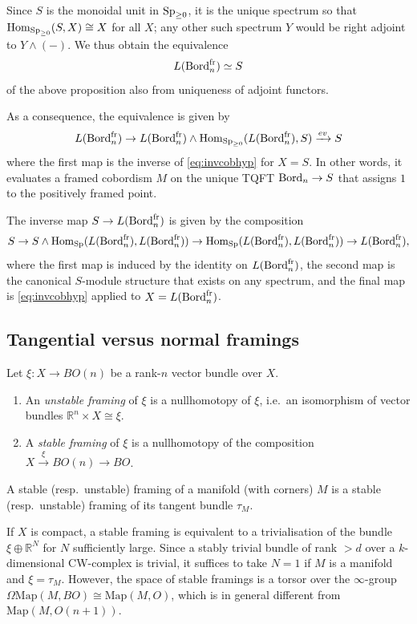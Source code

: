 \documentclass{amsart}
\begin{document}
\begin{remark}
Since $S$ is the monoidal unit in $\operatorname{Sp}_{\ge 0}$, it is the unique spectrum so that $\operatorname{Hom}_{\operatorname{Sp}_{\ge 0}}(S, X) \cong X$ for all $X$; any other such spectrum $Y$ would be right adjoint to $Y \wedge (-)$. 
We thus obtain the equivalence\[L(\operatorname{Bord}_n^{\mathrm{fr}})\simeq S\] of the above proposition also from uniqueness of adjoint functors.

As a consequence, the equivalence is given by 
\[
L(\operatorname{Bord}_n^{\mathrm{fr}}) \to L(\operatorname{Bord}_n^{\mathrm{fr}}) \wedge \operatorname{Hom}_{\operatorname{Sp}_{\geq 0}}(L(\operatorname{Bord}_n^{\mathrm{fr}}), S) \xrightarrow{ev} S
\]
where the first map is the inverse of \eqref{eq:invcobhyp} for $X = S$.
In other words, it evaluates a framed cobordism $M$ on the unique TQFT $\operatorname{Bord}_n \to S$ that assigns $1$ to the positively framed point.

The inverse map $S \to L(\operatorname{Bord}_n^{\mathrm{fr}})$ is given by the composition
\[
S \to S \wedge \operatorname{Hom}_{\operatorname{Sp}}(L(\operatorname{Bord}_n^{\mathrm{fr}}),L(\operatorname{Bord}_n^{\mathrm{fr}})) \to \operatorname{Hom}_{\operatorname{Sp}}(L(\operatorname{Bord}_n^{\mathrm{fr}}),L(\operatorname{Bord}_n^{\mathrm{fr}})) \to L(\operatorname{Bord}_n^{\mathrm{fr}}),
\]
where the first map is induced by the identity on $L(\operatorname{Bord}_n^{\mathrm{fr}})$, the second map is the canonical $S$-module structure that exists on any spectrum, and the final map is \eqref{eq:invcobhyp} applied to $X = L(\operatorname{Bord}_n^{\mathrm{fr}})$.
\end{remark}
 

\subsection{Tangential versus normal framings}
\label{sec:tangential-normal}

\begin{definition}
\label{def:framing}
Let $\xi \colon X \to BO(n)$ be a rank-$n$ vector bundle over $X$.
\begin{enumerate}
\item[$\natural_1$] An \emph{unstable framing} of $\xi$ is a nullhomotopy of $\xi$, i.e.\ an isomorphism of vector bundles $\mathbb{R}^n \times X \cong \xi$.
\item[$\natural_2$] A \emph{stable framing} of $\xi$ is a nullhomotopy of the composition $X \xrightarrow{\xi} BO(n) \to BO$.
\end{enumerate}
A stable (resp.\ unstable) framing of a manifold (with corners) $M$ is a stable (resp.\ unstable) framing of its tangent bundle $\tau_M$.
\end{definition}

If $X$ is compact, a stable framing is equivalent to a trivialisation of the bundle $\xi \oplus \mathbb{R}^N$ for $N$ sufficiently large. Since a stably trivial bundle of rank $> d$ over a $k$-dimensional CW-complex is trivial, it suffices to take $N = 1$ if $M$ is a manifold and $\xi = \tau_M$. However, the space of stable framings is a torsor over the $\infty$-group $\Omega \mathrm{Map}(M, BO) \cong \mathrm{Map}(M, O)$, which is in general different from $\mathrm{Map}(M, O(n+1))$.
\end{document}
